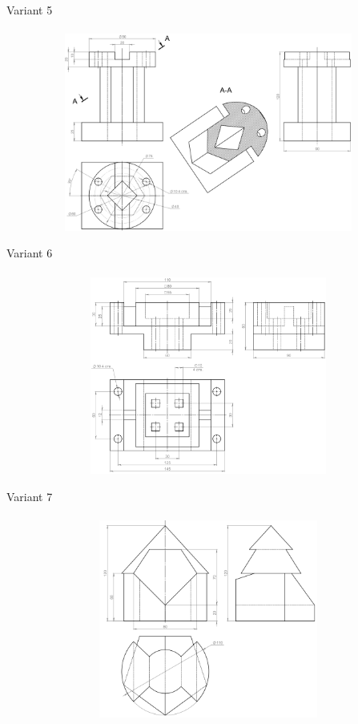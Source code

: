 \documentclass[aspectratio=169]{beamer}
\begin{document}
\begin{frame}[t]{Variant 5}
    \framesubtitle{}
    \vspace{-0.5cm}
    \begin{figure}[H]
        \centering\includegraphics[height=6.5cm,width=1\textwidth,keepaspectratio]{5.png}
        \label{fig:5.png}
    \end{figure}
\end{frame}

\begin{frame}[t]{Variant 6}
    \framesubtitle{}
    \vspace{-0.5cm}
    \begin{figure}[H]
        \centering\includegraphics[height=6.5cm,width=1\textwidth,keepaspectratio]{6.png}
        \label{fig:6.png}
    \end{figure}
\end{frame}

\begin{frame}[t]{Variant 7}
    \framesubtitle{}
    \vspace{-0.5cm}
    \begin{figure}[H]
        \centering\includegraphics[height=6.5cm,width=1\textwidth,keepaspectratio]{7.png}
        \label{fig:7.png}
    \end{figure}
\end{frame}
\end{document}
